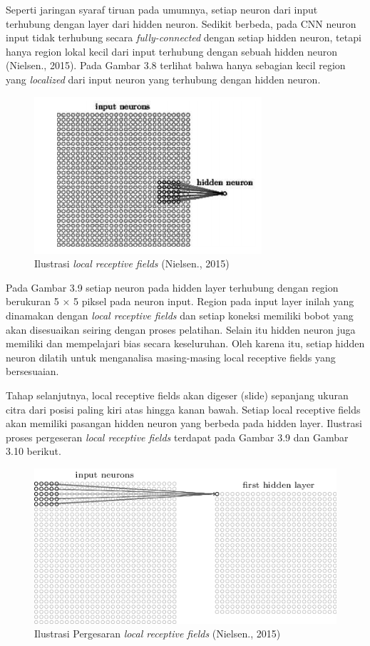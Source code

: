 Seperti jaringan syaraf tiruan pada umumnya, setiap neuron dari input
terhubung dengan layer dari hidden neuron. Sedikit berbeda, pada CNN neuron 
input tidak terhubung secara \emph{fully-connected} dengan setiap hidden neuron, tetapi 
hanya region lokal kecil dari input terhubung dengan sebuah hidden neuron
(Nielsen., 2015). Pada Gambar 3.8 terlihat bahwa hanya sebagian kecil region
yang \emph{localized} dari input neuron yang terhubung dengan hidden neuron.
\begin{figure}[h]
	\centering
	\includegraphics[width=0.5\linewidth]{hidenneuron}
	\caption{Ilustrasi \emph{local receptive fields} (Nielsen., 2015)}
	\label{fig:hidenneuron}
\end{figure}

Pada Gambar 3.9 setiap neuron pada hidden layer terhubung dengan
region berukuran 5 × 5 piksel pada neuron input. Region pada input layer inilah
yang dinamakan dengan \emph{local receptive fields} dan setiap koneksi memiliki bobot
yang akan disesuaikan seiring dengan proses pelatihan. Selain itu hidden neuron 
juga memiliki dan mempelajari bias secara keseluruhan. Oleh karena itu, setiap
hidden neuron dilatih untuk menganalisa masing-masing local receptive fields yang 
bersesuaian.

Tahap selanjutnya, local receptive fields akan digeser (slide) sepanjang 
ukuran citra dari posisi paling kiri atas hingga kanan bawah. Setiap local receptive
fields akan memiliki pasangan hidden neuron yang berbeda pada hidden layer.
Ilustrasi proses pergeseran \emph{local receptive fields} terdapat pada Gambar 3.9 dan
Gambar 3.10 berikut.
\begin{figure}[h]
	\centering
	\includegraphics[width=0.65\linewidth]{neuron2}
	\caption{Ilustrasi Pergesaran \emph{local receptive fields} (Nielsen., 2015)}
	\label{fig:neuron2}
\end{figure}

